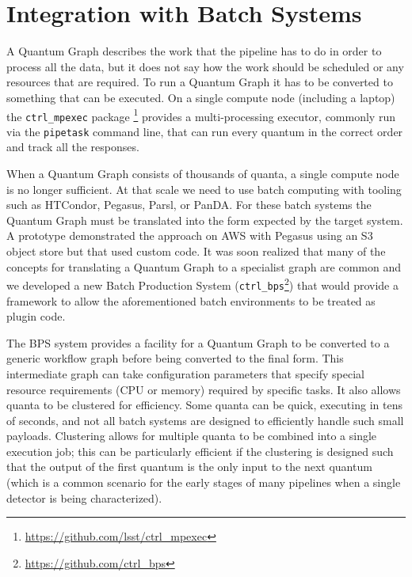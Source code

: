\documentclass[]{spie}
\begin{document}
\section{Integration with Batch Systems}

A Quantum Graph describes the work that the pipeline has to do in order to process all the data, but it does not say how the work should be scheduled or any resources that are required.
To run a Quantum Graph it has to be converted to something that can be executed.
On a single compute node (including a laptop) the \texttt{ctrl\_mpexec} package \footnote{\url{https://github.com/lsst/ctrl_mpexec}} provides a multi-processing executor, commonly run via the \texttt{pipetask} command line, that can run every quantum in the correct order and track all the responses.

When a Quantum Graph consists of thousands of quanta, a single compute node is no longer sufficient.
At that scale we need to use batch computing with tooling such as HTCondor,\cite{10.1002/cpe.938} Pegasus,\cite{10.1016/j.future.2014.10.008} Parsl,\cite{10.1145/3307681.3325400} or PanDA.\cite{10.1088/1742-6596/331/7/072024}
For these batch systems the Quantum Graph must be translated into the form expected by the target system.
A prototype demonstrated the approach on AWS with Pegasus using an S3 object store\cite{2020arXiv201106044B} but that used custom code.
It was soon realized that many of the concepts for translating a Quantum Graph to a specialist graph are common and we developed a new Batch Production System (\texttt{ctrl\_bps}\footnote{\url{https://github.com/ctrl_bps}}) that would provide a framework to allow the aforementioned batch environments to be treated as plugin code.

The BPS system provides a facility for a Quantum Graph to be converted to a generic workflow graph before being converted to the final form.
This intermediate graph can take configuration parameters that specify special resource requirements (CPU or memory) required by specific tasks.
It also allows quanta to be clustered for efficiency.
Some quanta can be quick, executing in tens of seconds, and not all batch systems are designed to efficiently handle such small payloads.
Clustering allows for multiple quanta to be combined into a single execution job; this can be particularly efficient if the clustering is designed such that the output of the first quantum is the only input to the next quantum (which is a common scenario for the early stages of many pipelines when a single detector is being characterized).
\end{document}
